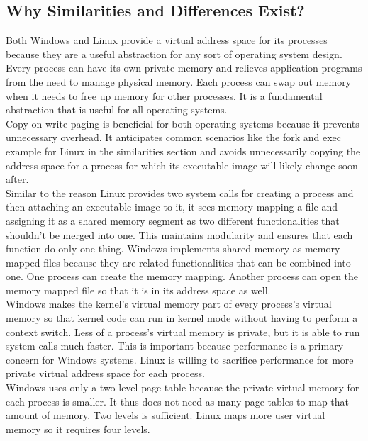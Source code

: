 \documentclass[letterpaper,10pt,titlepage]{article}
\begin{document}
\subsection{Why Similarities and Differences Exist?}
Both Windows and Linux provide a virtual address space for its processes
because they are a useful abstraction for any sort of operating system 
design. Every process can have its own private memory and relieves application
programs from the need to manage physical memory. Each process can swap out
memory when it needs to free up memory for other processes. It is a fundamental
abstraction that is useful for all operating systems.
\\
\linebreak
Copy-on-write paging is beneficial for both operating systems because it 
prevents unnecessary overhead. It anticipates common scenarios like the fork
and exec example for Linux in the similarities section and avoids 
unnecessarily copying the address space for a process for which its 
executable image will likely change soon after.
\\
\linebreak
Similar to the reason Linux provides two system calls for creating a process 
and then attaching an executable image to it, it sees memory mapping a file 
and assigning it as a shared memory segment as two different functionalities
that shouldn't be merged into one. This maintains modularity and ensures that
each function do only one thing. Windows implements shared memory as memory 
mapped files because they are related functionalities that can be combined 
into one. One process can create the memory mapping. Another process can
open the memory mapped file so that it is in its address space as well. 
\\
\linebreak
Windows makes the kernel's virtual memory part of every process's virtual 
memory so that kernel code can run in kernel mode without having to perform a 
context switch. Less of a process's virtual memory is private, but it is able
to run system calls much faster. This is important because performance is a 
primary concern for Windows systems. Linux is willing to sacrifice performance
for more private virtual address space for each process.
\\
\linebreak
Windows uses only a two level page table because the private virtual memory 
for each process is smaller. It thus does not need as many page tables to 
map that amount of memory. Two levels is sufficient. Linux maps more user
virtual memory so it requires four levels. 
\end{document}
